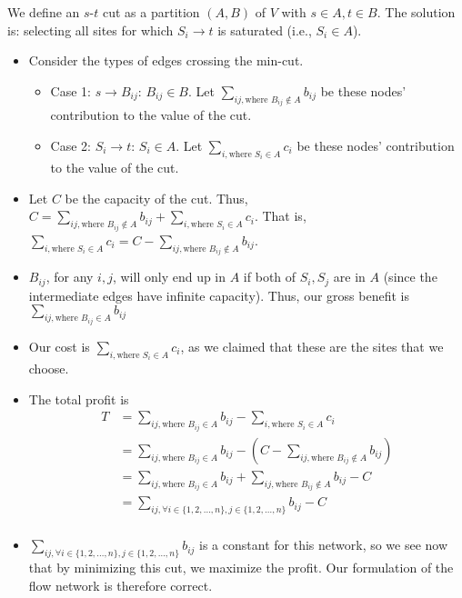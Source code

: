 We define an $s$-$t$ cut as a partition $(A, B)$ of $V$ with $s \in A, t \in B$. The solution is: selecting all sites for which $S_i \rightarrow t$ is saturated (i.e., $S_i \in A$).



\begin{itemize}
\item Consider the types of edges crossing the min-cut. 
	\begin{itemize}
		\item Case 1: $s \rightarrow B_{ij}$: $B_{ij} \in B$. Let $\sum_{ij, \text{where }B_{ij}\notin A} b_{ij}$ be these nodes' contribution to the value of the cut.
		\item Case 2: $S_i \rightarrow t$: $S_i \in A$. Let $\sum_{i, \text{where } S_{i}\in A} c_{i}$ be these nodes' contribution to the value of the cut.
	\end{itemize}
\item Let $C$ be the capacity of the cut. Thus, $C=\sum_{ij, \text{where }B_{ij}\notin A} b_{ij} + \sum_{i, \text{where } S_{i}\in A} c_{i}$. That is, $\sum_{i, \text{where } S_{i}\in A} c_{i} = C - \sum_{ij, \text{where }B_{ij}\notin A} b_{ij} $.
\item $B_{ij}$, for any $i,j$, will only end up in $A$ if both of $S_i,S_j$ are in $A$ (since the intermediate edges have infinite capacity). Thus, our gross benefit is $\sum_{ij, \text{where }B_{ij}\in A}b_{ij}$
\item Our cost is $\sum_{i, \text{where } S_{i}\in A} c_{i}$, as we claimed that these are the sites that we choose.
\item The total profit is 
$$
\begin{aligned}
T&=\sum_{ij, \text{where }B_{ij}\in A}b_{ij}-\sum_{i, \text{where } S_{i}\in A} c_{i}\\
&=\sum_{ij, \text{where }B_{ij}\in A}b_{ij}-(C - \sum_{ij, \text{where }B_{ij}\notin A} b_{ij} )\\
&=\sum_{ij, \text{where }B_{ij}\in A}b_{ij}+ \sum_{ij, \text{where }B_{ij}\notin A} b_{ij} - C\\
&=\sum_{ij, \forall i \in \{1, 2, \dots, n\}, j \in \{1, 2, \dots, n\}}b_{ij} - C\\
\end{aligned}
$$
\item $\sum_{ij, \forall i \in \{1, 2, \dots, n\}, j \in \{1, 2, \dots, n\}}b_{ij}$ is a constant for this network, so we see now that by minimizing this cut, we maximize the profit. Our formulation of the flow network is therefore correct.
\end{itemize}

